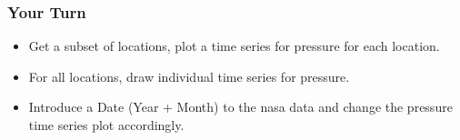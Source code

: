 \documentclass{beamer}\usepackage[]{graphicx}\usepackage[]{color}
\begin{document}
\begin{frame}
\frametitle{Your Turn}
\begin{itemize}
\item Get a subset of locations, plot a time series for pressure for each location. \\\medskip
\item For all locations, draw individual time series for pressure.\\\medskip
\item Introduce a Date (Year + Month) to the nasa data and change the pressure time series plot accordingly.
\end{itemize}
\end{frame}
\end{document}
